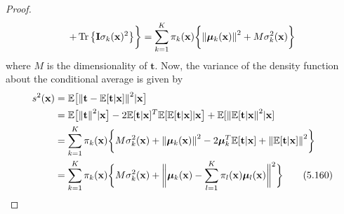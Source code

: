 \begin{proof}
\[            + \Tr\big\{\mathbf{I} \sigma_k(\mathbf{x})^2\big\}\bigg\}
        = \sum_{k=1}^{K} \pi_k(\mathbf{x})\bigg\{
            \norm{\bm{\mu}_k(\mathbf{x})}^2 + M\sigma_k^2(\mathbf{x})\bigg\}
    \] 
    where $M$ is the dimensionality of $\mathbf{t}$.
    Now, the variance of the density function about the conditional average is given by
    \begin{align*}
        s^2(\mathbf{x}) 
        &= \mathbb{E}\big[\norm{\mathbf{t} 
            - \mathbb{E}[\mathbf{t} | \mathbf{x}]}^2 | \mathbf{x}\big] \\
        &= \mathbb{E}\big[\norm{\mathbf{t}}^2 | \mathbf{x}\big] 
        - 2\mathbb{E}[\mathbf{t} | \mathbf{x}]^T 
            \mathbb{E}[\mathbb{E}[\mathbf{t} | \mathbf{x}] | \mathbf{x}\big]
            + \mathbb{E}[\norm{\mathbb{E}[\mathbf{t} | \mathbf{x}}^2 | \mathbf{x}] \\
        &= \sum_{k=1}^{K} \pi_k(\mathbf{x}) \bigg\{
            M\sigma_k^2(\mathbf{x}) + \norm{\bm{\mu}_k(\mathbf{x})}^2 
            - 2\bm{\mu}_k^T \mathbb{E}[\mathbf{t} | \mathbf{x}] 
            + \norm{\mathbb{E}[\mathbf{t} | \mathbf{x}]}^2\bigg\} \\
        &= \sum_{k=1}^{K} \pi_k(\mathbf{x}) \bigg\{
            M\sigma_k^2(\mathbf{x}) + 
            \bigg\Vert
            \bm{\mu}_k(\mathbf{x})
            - \sum_{l=1}^{K} \pi_l(\mathbf{x}) \bm{\mu}_l(\mathbf{x})\bigg\Vert^2\bigg\}
        \label{eq:5.160}\tag{5.160}
    \end{align*}
\end{proof}
